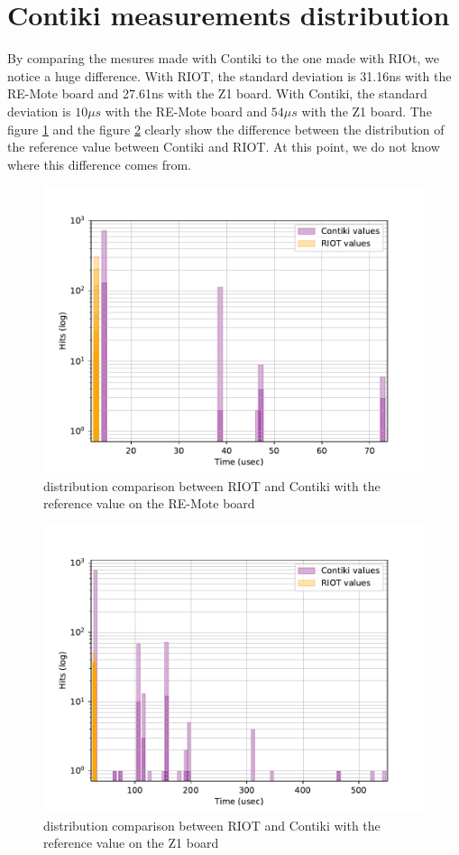 \newpage
\section{Contiki measurements distribution}

By comparing the mesures made with Contiki to the one made with RIOt, we notice a huge difference.
With RIOT, the standard deviation is 31.16ns with the RE-Mote board and 27.61ns with the Z1 board.
With Contiki, the standard deviation is $10\mu s$ with the RE-Mote board and $54\mu s$ with the Z1 board.
The figure \ref{fig:deviation-ref-value-remote} and the figure \ref{fig:deviation-ref-value-z1} clearly show the difference between the distribution of the reference value between Contiki and RIOT.
At this point, we do not know where this difference comes from.

\begin{figure}[!ht]
  \centering
  \includegraphics[scale=.7]{assets/offset-remote.pdf}
  \caption{distribution comparison between RIOT and Contiki with the reference value on the RE-Mote board\label{fig:deviation-ref-value-remote}}
\end{figure}

\begin{figure}[!ht]
  \centering
  \includegraphics[scale=.7]{assets/offset-z1.pdf}
  \caption{distribution comparison between RIOT and Contiki with the reference value on the Z1 board\label{fig:deviation-ref-value-z1}}
\end{figure}